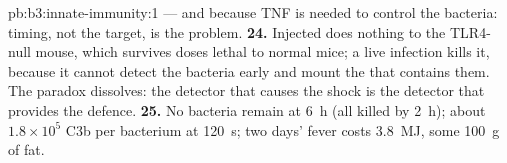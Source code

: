 \begin{solution}{pb:b3:innate-immunity:1}
--- and because TNF is needed to control the bacteria: timing, not
the target, is the problem.
\textbf{24.} Injected  does nothing to the TLR4-null
mouse, which survives doses lethal to normal mice; a live 
infection kills it, because it cannot detect the bacteria early and
mount the  that contains them. The paradox dissolves: the
detector that causes the shock is the detector that provides the
defence.
\textbf{25.} No bacteria remain at \qty{6}{h} (all killed by \qty{2}{h});
about $1.8\times 10^{5}$ C3b per bacterium at \qty{120}{s}; two days'
fever costs \qty{3.8}{MJ}, some \qty{100}{g} of fat.
\end{solution}
